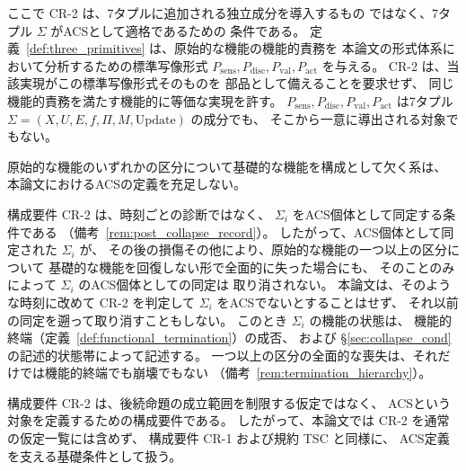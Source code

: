ここで CR-2 は、7タプルに追加される独立成分を導入するもの
ではなく、7タプル $\Sigma$ がACSとして適格であるための
条件である。
定義~\ref{def:three_primitives} は、原始的な機能の機能的責務を
本論文の形式体系において分析するための標準写像形式
$P_{\mathrm{sens}},P_{\mathrm{disc}},P_{\mathrm{val}},P_{\mathrm{act}}$ を与える。
CR-2 は、当該実現がこの標準写像形式そのものを
部品として備えることを要求せず、
同じ機能的責務を満たす機能的に等価な実現を許す。
$P_{\mathrm{sens}},P_{\mathrm{disc}},P_{\mathrm{val}},P_{\mathrm{act}}$ は7タプル
$\Sigma=(X,U,E,f,\Pi,M,\mathrm{Update})$ の成分でも、
そこから一意に導出される対象でもない。

原始的な機能のいずれかの区分について基礎的な機能を構成として欠く系は、
本論文におけるACSの定義を充足しない。

構成要件 CR-2 は、時刻ごとの診断ではなく、
$\Sigma_i$ をACS個体として同定する条件である
（備考~\ref{rem:post_collapse_record}）。
したがって、ACS個体として同定された $\Sigma_i$ が、
その後の損傷その他により、原始的な機能の一つ以上の区分について
基礎的な機能を回復しない形で全面的に失った場合にも、
そのことのみによって $\Sigma_i$ のACS個体としての同定は
取り消されない。
本論文は、そのような時刻に改めて CR-2 を判定して
$\Sigma_i$ をACSでないとすることはせず、
それ以前の同定を遡って取り消すこともしない。
このとき $\Sigma_i$ の機能の状態は、
機能的終端（定義~\ref{def:functional_termination}）の成否、
および \S\ref{sec:collapse_cond} の記述的状態帯によって記述する。
一つ以上の区分の全面的な喪失は、それだけでは機能的終端でも崩壊でもない
（備考~\ref{rem:termination_hierarchy}）。

構成要件 CR-2 は、後続命題の成立範囲を制限する仮定ではなく、
ACSという対象を定義するための構成要件である。
したがって、本論文では CR-2 を通常の仮定一覧には含めず、
構成要件 CR-1 および規約 TSC と同様に、
ACS定義を支える基礎条件として扱う。

